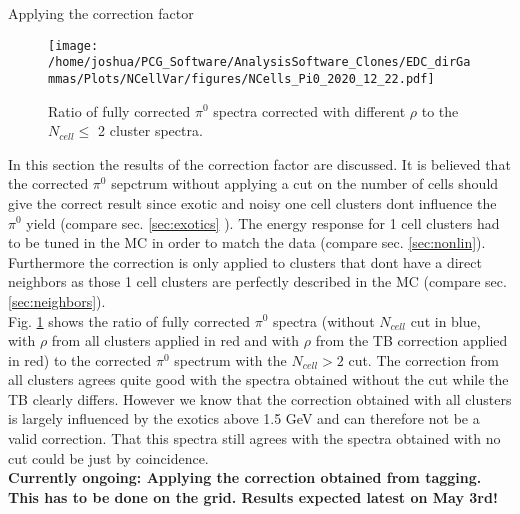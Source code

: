 \documentclass[ALICE]{ALICE_analysis_notes}
\newcommand{\PZ}{$\pi^0$\xspace}
\begin{document}
\begin{section}{Applying the correction factor}
	\begin{figure}[t]
		\centering
		\texttt{[image: /home/joshua/PCG\_Software/AnalysisSoftware\_Clones/EDC\_dirGammas/Plots/NCellVar/figures/NCells\_Pi0\_2020\_12\_22.pdf]}
		\caption{Ratio of fully corrected $\pi^{0}$ spectra corrected with different $\rho$ to the $N_{cell} \leq$ 2 cluster spectra.}
		\label{fig:NCells_Pi0Spec}
	\end{figure}

	In this section the results of the correction factor are discussed. It is believed that the corrected \PZ sepctrum without applying a cut on the number of cells should give the correct result since exotic and noisy one cell clusters dont influence the \PZ yield (compare sec. \ref{sec:exotics} ). The energy response for 1 cell clusters had to be tuned in the MC in order to match the data (compare sec. \ref{sec:nonlin}). Furthermore the correction is only applied to clusters that dont have a direct neighbors as those 1 cell clusters are perfectly described in the MC (compare sec. \ref{sec:neighbors}).\\
	Fig. \ref{fig:NCells_Pi0Spec} shows the ratio of fully corrected \PZ spectra (without $N_{cell}$ cut in blue, with $\rho$ from all clusters applied in red and with $\rho$ from the TB correction applied in red) to the corrected \PZ spectrum with the $N_{cell} > 2$ cut. The correction from all clusters agrees quite good with the spectra obtained without the cut while the TB clearly differs. However we know that the correction obtained with all clusters is largely influenced by the exotics above 1.5 GeV and can therefore not be a valid correction. That this spectra still agrees with the spectra obtained with no cut could be just by coincidence.\\
	\textbf{Currently ongoing: Applying the correction obtained from tagging. This has to be done on the grid. Results expected latest on May 3rd! }
	

	
\end{section}


\newpage
\end{document}
